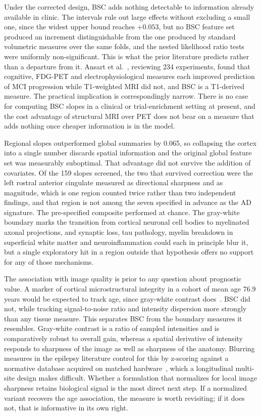 \documentclass[blue]{ludusofficial}  %
\begin{document}
Under the corrected design, BSC adds nothing detectable to information already available in clinic. The intervals rule out large effects without excluding a small one, since the widest upper bound reaches $+0.053$, but no BSC feature set produced an increment distinguishable from the one produced by standard volumetric measures over the same folds, and the nested likelihood ratio tests were uniformly non-significant. This is what the prior literature predicts rather than a departure from it. Ansart et al.~\cite{ansart2021predicting}, reviewing 234 experiments, found that cognitive, FDG-PET and electrophysiological measures each improved prediction of MCI progression while T1-weighted MRI did not, and BSC is a T1-derived measure. The practical implication is correspondingly narrow. There is no case for computing BSC slopes in a clinical or trial-enrichment setting at present, and the cost advantage of structural MRI over PET does not bear on a measure that adds nothing once cheaper information is in the model.

Regional slopes outperformed global summaries by 0.065, so collapsing the cortex into a single number discards spatial information and the original global feature set was measurably suboptimal. That advantage did not survive the addition of covariates. Of the 159 slopes screened, the two that survived correction were the left rostral anterior cingulate measured as directional sharpness and as magnitude, which is one region counted twice rather than two independent findings, and that region is not among the seven specified in advance as the AD signature. The pre-specified composite performed at chance. The gray-white boundary marks the transition from cortical neuronal cell bodies to myelinated axonal projections, and synaptic loss, tau pathology, myelin breakdown in superficial white matter and neuroinflammation could each in principle blur it, but a single exploratory hit in a region outside that hypothesis offers no support for any of those mechanisms.

The association with image quality is prior to any question about prognostic value. A marker of cortical microstructural integrity in a cohort of mean age 76.9 years would be expected to track age, since gray-white contrast does~\cite{salat2009age}. BSC did not, while tracking signal-to-noise ratio and intensity dispersion more strongly than any tissue measure. This separates BSC from the boundary measures it resembles. Gray-white contrast is a ratio of sampled intensities and is comparatively robust to overall gain, whereas a spatial derivative of intensity responds to sharpness of the image as well as sharpness of the anatomy. Blurring measures in the epilepsy literature control for this by z-scoring against a normative database acquired on matched hardware~\cite{huppertz2005enhanced,blackmon2015cortical}, which a longitudinal multi-site design makes difficult. Whether a formulation that normalizes for local image sharpness retains biological signal is the most direct next step. If a normalized variant recovers the age association, the measure is worth revisiting; if it does not, that is informative in its own right.
\end{document}
